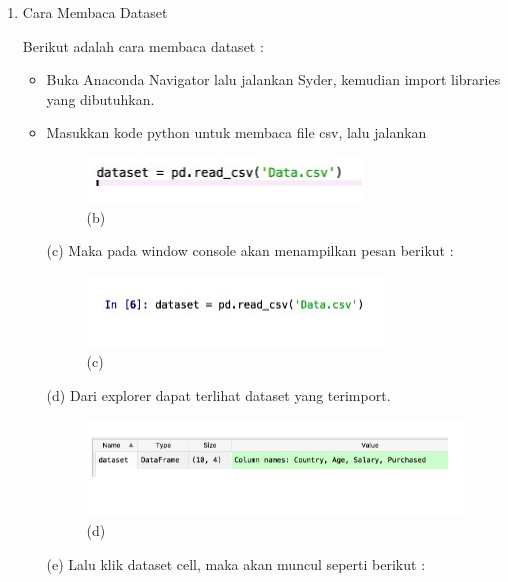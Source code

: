 \begin{enumerate}
\begin{itemize}
\par
\end{itemize}

\item Cara Membaca Dataset

Berikut adalah cara membaca dataset :
\begin{itemize}
\item Buka Anaconda Navigator lalu jalankan Syder, kemudian import libraries yang dibutuhkan.
\item Masukkan kode python untuk membaca file csv, lalu jalankan

\begin{figure}[!hbtp]
\centering
\includegraphics[scale=0.5]{figures/AIP/y1.PNG}
\caption{(b)}
\label{contoh}
\end{figure}
\par (c) Maka pada window console akan menampilkan pesan berikut :
\begin{figure}[!hbtp]
\centering
\includegraphics[scale=0.9]{figures/AIP/y2.PNG}
\caption{(c)}
\label{contoh}
\end{figure}
\par (d) Dari explorer dapat terlihat dataset yang terimport.
\begin{figure}[!hbtp]
\centering
\includegraphics[scale=0.6]{figures/AIP/y3.PNG}
\caption{(d)}
\label{contoh}
\end{figure}
\par (e) Lalu klik dataset cell, maka akan muncul seperti berikut :
\begin{figure}[!hbtp]
\centering

\end{figure}
\end{itemize}
\end{enumerate}
